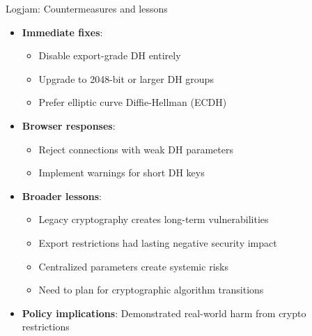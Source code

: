 \documentclass[aspectratio=169, lualatex, handout]{beamer}
\begin{document}
\begin{frame}{Logjam: Countermeasures and lessons}
	\begin{itemize}[<+->]
		\item \textbf{Immediate fixes}:
		      \begin{itemize}
			      \item Disable export-grade DH entirely
			      \item Upgrade to 2048-bit or larger DH groups
			      \item Prefer elliptic curve Diffie-Hellman (ECDH)
		      \end{itemize}
		\item \textbf{Browser responses}:
		      \begin{itemize}
			      \item Reject connections with weak DH parameters
			      \item Implement warnings for short DH keys
		      \end{itemize}
		\item \textbf{Broader lessons}:
		      \begin{itemize}
			      \item Legacy cryptography creates long-term vulnerabilities
			      \item Export restrictions had lasting negative security impact
			      \item Centralized parameters create systemic risks
			      \item Need to plan for cryptographic algorithm transitions
		      \end{itemize}
		\item \textbf{Policy implications}: Demonstrated real-world harm from crypto restrictions
	\end{itemize}
\end{frame}
\end{document}
